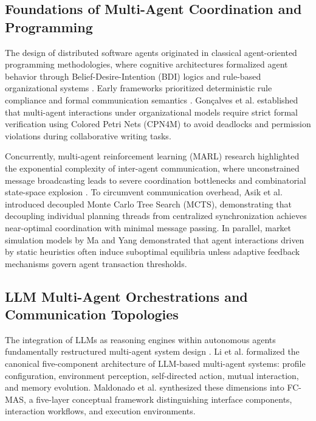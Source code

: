 \documentclass[conference]{IEEEtran}
\begin{document}
\subsection{Foundations of Multi-Agent Coordination and Programming}
The design of distributed software agents originated in classical agent-oriented programming methodologies, where cognitive architectures formalized agent behavior through Belief-Desire-Intention (BDI) logics and rule-based organizational systems \cite{cardoso2021, noor2023}. Early frameworks prioritized deterministic rule compliance and formal communication semantics \cite{cardoso2021}. Gon\c{c}alves et al. \cite{goncalves2022} established that multi-agent interactions under organizational models require strict formal verification using Colored Petri Nets (CPN4M) to avoid deadlocks and permission violations during collaborative writing tasks. 

Concurrently, multi-agent reinforcement learning (MARL) research highlighted the exponential complexity of inter-agent communication, where unconstrained message broadcasting leads to severe coordination bottlenecks and combinatorial state-space explosion \cite{canese2021}. To circumvent communication overhead, Asik et al. \cite{asik2023} introduced decoupled Monte Carlo Tree Search (MCTS), demonstrating that decoupling individual planning threads from centralized synchronization achieves near-optimal coordination with minimal message passing. In parallel, market simulation models by Ma and Yang \cite{ma2023} demonstrated that agent interactions driven by static heuristics often induce suboptimal equilibria unless adaptive feedback mechanisms govern agent transaction thresholds. 

\subsection{LLM Multi-Agent Orchestrations and Communication Topologies}
The integration of LLMs as reasoning engines within autonomous agents fundamentally restructured multi-agent system design \cite{li2024, acharya2025}. Li et al. \cite{li2024} formalized the canonical five-component architecture of LLM-based multi-agent systems: profile configuration, environment perception, self-directed action, mutual interaction, and memory evolution. Maldonado et al. \cite{maldonado2024} synthesized these dimensions into FC-MAS, a five-layer conceptual framework distinguishing interface components, interaction workflows, and execution environments.
\end{document}
